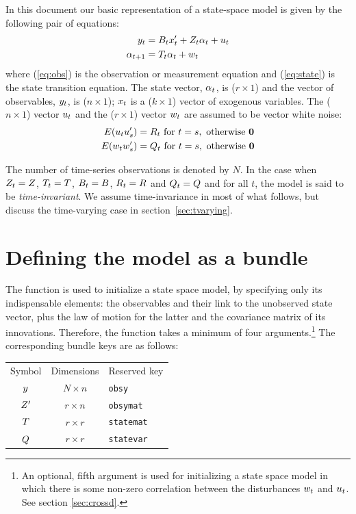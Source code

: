 In this document our basic representation of a state-space model is
given by the following pair of equations:
%
\begin{align}
  \label{eq:obs}
  y_t &= B_tx_t' + Z_t \alpha_t +
  u_t \\
  \label{eq:state}
  \alpha_{t+1} &= T_t \alpha_t + w_t
\end{align}
%
where (\ref{eq:obs}) is the observation or measurement equation and
(\ref{eq:state}) is the state transition equation.  The state
vector, $\alpha_{t}$, is ($r \times 1$) and the vector of
observables, $y_t$, is ($n \times 1$); $x_t$ is a ($k
\times 1$) vector of exogenous variables.  The ($n \times 1$) vector
$u_t$ and the ($r \times 1$) vector $w_t$ are assumed to
be vector white noise:
%
\begin{align*}
E(u_t u_s') &= R_t \mbox{ for } t = s, 
    \mbox{ otherwise } \mathbf{0} \\
E(w_t w_s') &= Q_t \mbox{ for } t = s, 
    \mbox{ otherwise } \mathbf{0}
\end{align*}

The number of time-series observations is denoted by $N$.  In the case
when $Z_t = Z$, $T_t = T$,
$B_t = B$, $R_t = R$ and
$Q_t = Q$ and for all $t$, the model is said to be
\emph{time-invariant}. We assume time-invariance in most of what
follows, but discuss the time-varying case in
section~\ref{sec:tvarying}.

\section{Defining the model as a bundle}
\label{sec:setup}

The  function is used to initialize a state space model,
by specifying only its indispensable elements: the observables and
their link to the unobserved state vector, plus the law of motion for
the latter and the covariance matrix of its innovations. Therefore,
the function takes a minimum of four arguments.\footnote{An optional,
  fifth argument is used for initializing a state space model in which
  there is some non-zero correlation between the disturbances
  $w_t$ and $u_t$. See section \ref{sec:crossd}.} The
corresponding bundle keys are as follows:

\begin{center}
\begin{tabular}{ccl}
Symbol & Dimensions & Reserved key \\[6pt]
$y$    & $N \times n$ & \texttt{obsy}\\
$Z'$   & $r \times n$ & \texttt{obsymat}\\
$T$  & $r \times r$ & \texttt{statemat}\\
$Q$  & $r \times r$ & \texttt{statevar}\\
\end{tabular}
\end{center}

